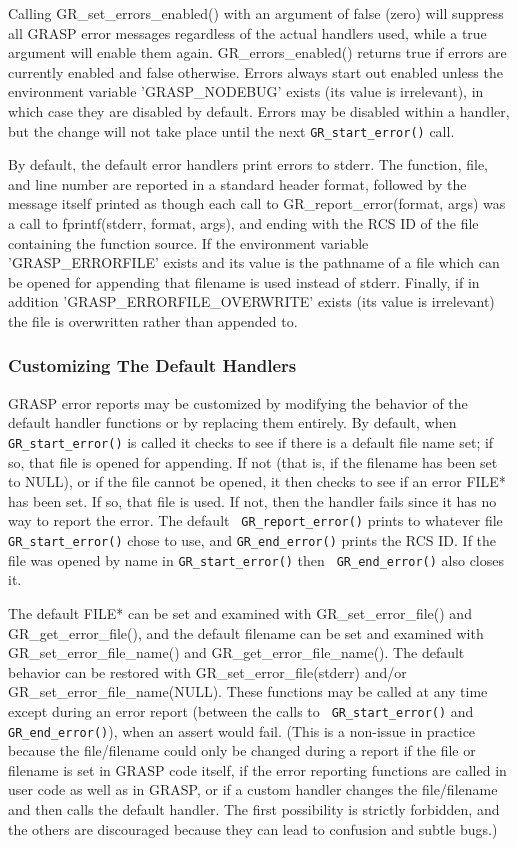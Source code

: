 Calling GR\_set\_errors\_enabled() with an argument of false (zero)
will suppress all GRASP error messages regardless of the actual
handlers used, while a true argument will enable them again.
GR\_errors\_enabled() returns true if errors are currently enabled and
false otherwise.  Errors always start out enabled unless the
environment variable 'GRASP\_NODEBUG' exists (its value is irrelevant),
in which case they are disabled by default.  Errors may be disabled
within a handler, but the change will not take place until the next
{\tt GR\_start\_error()} call.

By default, the default error handlers print errors to stderr.  The
function, file, and line number are reported in a standard header
format, followed by the message itself printed as though each call to
GR\_report\_error(format, args) was a call to fprintf(stderr, format,
args), and ending with the RCS ID of the file containing the function
source.  If the environment variable 'GRASP\_ERRORFILE' exists and its
value is the pathname of a file which can be opened for appending that
filename is used instead of stderr.  Finally, if in addition
'GRASP\_ERRORFILE\_OVERWRITE' exists (its value is irrelevant) the file
is overwritten rather than appended to.

\subsubsection{Customizing The Default Handlers}

GRASP error reports may be customized by modifying the behavior of the
default handler functions or by replacing them entirely.  By default,
when {\tt GR\_start\_error()} is called it checks to see if there is a
default file name set; if so, that file is opened for appending.  If
not (that is, if the filename has been set to NULL), or if the file
cannot be opened, it then checks to see if an error FILE* has been
set.  If so, that file is used.  If not, then the handler fails since
it has no way to report the error.  The default {\tt
GR\_report\_error()} prints to whatever file {\tt GR\_start\_error()}
chose to use, and {\tt GR\_end\_error()} prints the RCS ID.  If the
file was opened by name in {\tt GR\_start\_error()} then {\tt
GR\_end\_error()} also closes it.

The default FILE* can be set and examined with GR\_set\_error\_file()
and GR\_get\_error\_file(), and the default filename can be set and
examined with GR\_set\_error\_file\_name() and
GR\_get\_error\_file\_name().  The default behavior can be restored
with GR\_set\_error\_file(stderr) and/or
GR\_set\_error\_file\_name(NULL).  These functions may be called at any
time except during an error report (between the calls to {\tt
GR\_start\_error()} and {\tt GR\_end\_error()}), when an assert would
fail.  (This is a non-issue in practice because the file/filename could
only be changed during a report if the file or filename is set in GRASP
code itself, if the error reporting functions are called in user code
as well as in GRASP, or if a custom handler changes the file/filename
and then calls the default handler.  The first possibility is strictly
forbidden, and the others are discouraged because they can lead to
confusion and subtle bugs.)

